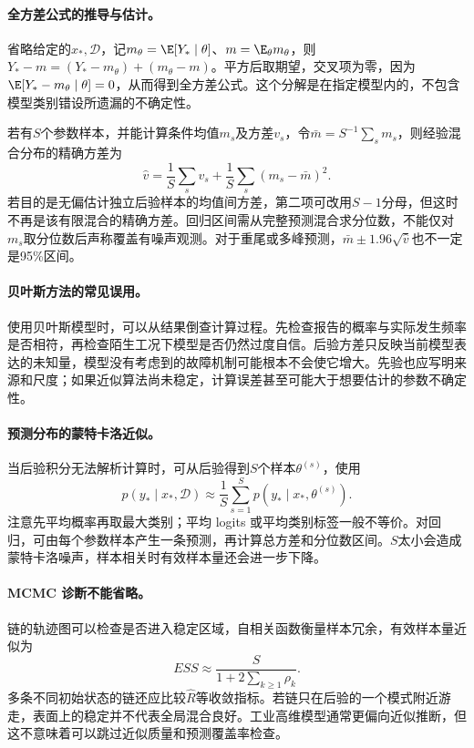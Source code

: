 \paragraph{全方差公式的推导与估计。}
省略给定的$x_*,\mathcal D$，记$m_\theta=\E[Y_*\mid\theta]$、$m=\E_\theta m_\theta$，则$Y_*-m=(Y_*-m_\theta)+(m_\theta-m)$。平方后取期望，交叉项为零，因为$\E[Y_*-m_\theta\mid\theta]=0$，从而得到全方差公式。这个分解是在指定模型内的，不包含模型类别错设所遗漏的不确定性。

若有$S$个参数样本，并能计算条件均值$m_s$及方差$v_s$，令$\bar m=S^{-1}\sum_sm_s$，则经验混合分布的精确方差为
\begin{equation}
 \hat v=\frac1S\sum_sv_s+\frac1S\sum_s(m_s-\bar m)^2.
\end{equation}
若目的是无偏估计独立后验样本的均值间方差，第二项可改用$S-1$分母，但这时不再是该有限混合的精确方差。回归区间需从完整预测混合求分位数，不能仅对$m_s$取分位数后声称覆盖有噪声观测。对于重尾或多峰预测，$\bar m\pm1.96\sqrt{\hat v}$也不一定是95\%区间。

\paragraph{贝叶斯方法的常见误用。}
使用贝叶斯模型时，可以从结果倒查计算过程。先检查报告的概率与实际发生频率是否相符，再检查陌生工况下模型是否仍然过度自信。后验方差只反映当前模型表达的未知量，模型没有考虑到的故障机制可能根本不会使它增大。先验也应写明来源和尺度；如果近似算法尚未稳定，计算误差甚至可能大于想要估计的参数不确定性。

\paragraph{预测分布的蒙特卡洛近似。}
当后验积分无法解析计算时，可从后验得到$S$个样本$\theta^{(s)}$，使用
\begin{equation}
 p(y_*\mid x_*,\mathcal D)\approx\frac1S\sum_{s=1}^{S}p(y_*\mid x_*,\theta^{(s)}).
\end{equation}
注意先平均概率再取最大类别；平均 logits 或平均类别标签一般不等价。对回归，可由每个参数样本产生一条预测，再计算总方差和分位数区间。$S$太小会造成蒙特卡洛噪声，样本相关时有效样本量还会进一步下降。

\paragraph{MCMC 诊断不能省略。}
链的轨迹图可以检查是否进入稳定区域，自相关函数衡量样本冗余，有效样本量近似为
\begin{equation}
 ESS\approx\frac{S}{1+2\sum_{k\geq1}\rho_k}.
\end{equation}
多条不同初始状态的链还应比较$\hat R$等收敛指标。若链只在后验的一个模式附近游走，表面上的稳定并不代表全局混合良好。工业高维模型通常更偏向近似推断，但这不意味着可以跳过近似质量和预测覆盖率检查。

